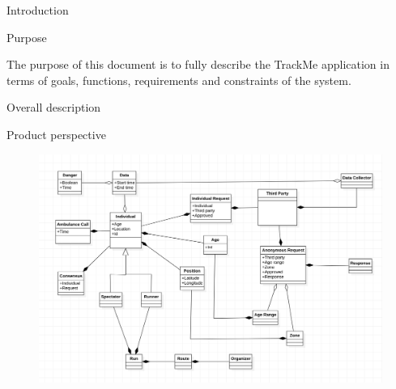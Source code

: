 \documentclass{article}
\begin{document}
	\begin{legal}\bfseries
	
 	\item {Introduction}
  		\begin{legal}\bfseries
    		\item Purpose
		\end{legal}
	{\normalfont The purpose of this document is to fully describe the TrackMe application in terms of goals, functions, requirements and constraints of the system.}
\newpage
 	\item {Overall description}
  		\begin{legal}\bfseries
    		\item Product perspective
		\end{legal}
	\begin{figure}[H]
  	\includegraphics[width=\linewidth]{UML1-0.png}
	\end{figure}
	
	\end{legal}
\end{document}
